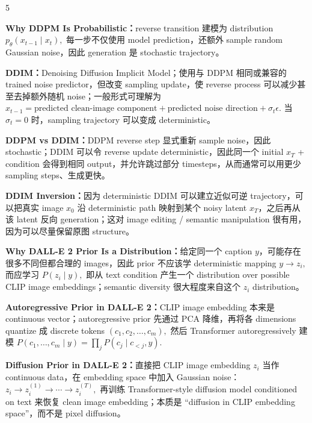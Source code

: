 \documentclass[a4paper, landscape]{article}
\begin{document}
\begin{multicols}{5}
\par \textbf{Why DDPM Is Probabilistic：}reverse transition 建模为 distribution
\(
p_\theta(x_{t-1}\mid x_t),
\)
每一步不仅使用 model prediction，还额外 sample random Gaussian noise，因此 generation 是 stochastic trajectory。

\par \textbf{DDIM：}Denoising Diffusion Implicit Model；使用与 DDPM 相同或兼容的 trained noise predictor，但改变 sampling update，使 reverse process 可以减少甚至去掉额外随机 noise；一般形式可理解为
\(
x_{t-1}
=
\text{predicted clean-image component}
+
\text{predicted noise direction}
+
\sigma_t\epsilon.
\)
当 \(\sigma_t=0\) 时，sampling trajectory 可以变成 deterministic。

\par \textbf{DDPM vs DDIM：}DDPM reverse step 显式重新 sample noise，因此 stochastic；DDIM 可以令 reverse update deterministic，因此同一个 initial \(x_T\) + condition 会得到相同 output，并允许跳过部分 timesteps，从而通常可以用更少 sampling steps、生成更快。

\par \textbf{DDIM Inversion：}因为 deterministic DDIM 可以建立近似可逆 trajectory，可以把真实 image \(x_0\) 沿 deterministic path 映射到某个 noisy latent \(x_T\)，之后再从该 latent 反向 generation；这对 image editing / semantic manipulation 很有用，因为可以尽量保留原图 structure。

\par \textbf{Why DALL-E 2 Prior Is a Distribution：}给定同一个 caption \(y\)，可能存在很多不同但都合理的 images，因此 prior 不应该学 deterministic mapping
\(
y\rightarrow z_i,
\)
而应学习
\(
P(z_i\mid y),
\)
即从 text condition 产生一个 distribution over possible CLIP image embeddings；semantic diversity 很大程度来自这个 \(z_i\) distribution。

\par \textbf{Autoregressive Prior in DALL-E 2：}CLIP image embedding 本来是 continuous vector；autoregressive prior 先通过 PCA 降维，再将各 dimensions quantize 成 discrete tokens
\(
(c_1,c_2,\ldots,c_m),
\)
然后 Transformer autoregressively 建模
\(
P(c_1,\ldots,c_m\mid y)
=
\prod_jP(c_j\mid c_{<j},y).
\)

\par \textbf{Diffusion Prior in DALL-E 2：}直接把 CLIP image embedding \(z_i\) 当作 continuous data，在 embedding space 中加入 Gaussian noise：
\(
z_i\rightarrow z_i^{(1)}\rightarrow\cdots\rightarrow z_i^{(T)},
\)
再训练 Transformer-style diffusion model conditioned on text 来恢复 clean image embedding；本质是 ``diffusion in CLIP embedding space''，而不是 pixel diffusion。


\end{multicols}
\end{document}
